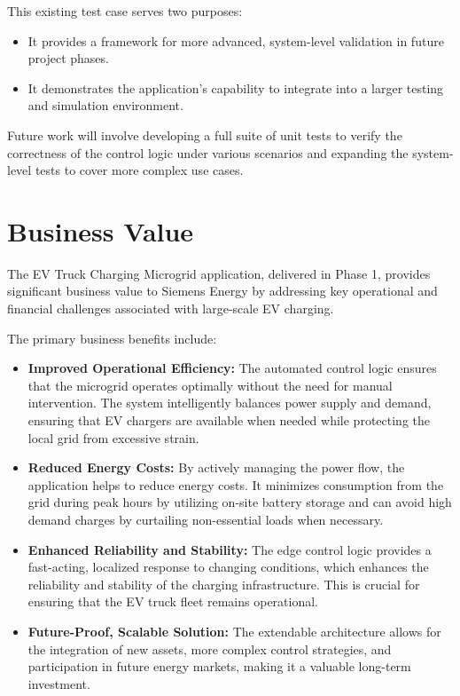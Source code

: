 \documentclass{article}
\begin{document}
This existing test case serves two purposes:
\begin{itemize}
    \item It provides a framework for more advanced, system-level validation in future project phases.
    \item It demonstrates the application's capability to integrate into a larger testing and simulation environment.
\end{itemize}

Future work will involve developing a full suite of unit tests to verify the correctness of the control logic under various scenarios and expanding the system-level tests to cover more complex use cases.

\section{Business Value}
The EV Truck Charging Microgrid application, delivered in Phase 1, provides significant business value to Siemens Energy by addressing key operational and financial challenges associated with large-scale EV charging.

The primary business benefits include:
\begin{itemize}
    \item \textbf{Improved Operational Efficiency:} The automated control logic ensures that the microgrid operates optimally without the need for manual intervention. The system intelligently balances power supply and demand, ensuring that EV chargers are available when needed while protecting the local grid from excessive strain.
    \item \textbf{Reduced Energy Costs:} By actively managing the power flow, the application helps to reduce energy costs. It minimizes consumption from the grid during peak hours by utilizing on-site battery storage and can avoid high demand charges by curtailing non-essential loads when necessary.
    \item \textbf{Enhanced Reliability and Stability:} The edge control logic provides a fast-acting, localized response to changing conditions, which enhances the reliability and stability of the charging infrastructure. This is crucial for ensuring that the EV truck fleet remains operational.
    \item \textbf{Future-Proof, Scalable Solution:} The extendable architecture allows for the integration of new assets, more complex control strategies, and participation in future energy markets, making it a valuable long-term investment.
\end{itemize}
\end{document}
